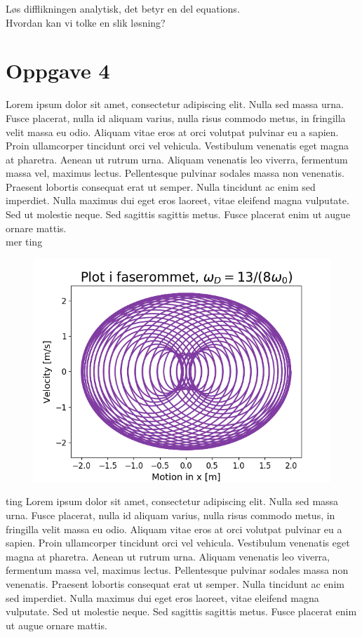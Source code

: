 \documentclass[norsk,a4paper,12pt]{article}
\begin{document}
Løs difflikningen analytisk, det betyr en del equations.
\\
Hvordan kan vi tolke en slik løsning?
\\

\section*{Oppgave 4}

Lorem ipsum dolor sit amet, consectetur adipiscing elit. Nulla sed massa urna. Fusce placerat, nulla id aliquam varius, nulla risus commodo metus, in fringilla velit massa eu odio. Aliquam vitae eros at orci volutpat pulvinar eu a sapien. Proin ullamcorper tincidunt orci vel vehicula. Vestibulum venenatis eget magna at pharetra. Aenean ut rutrum urna. Aliquam venenatis leo viverra, fermentum massa vel, maximus lectus. Pellentesque pulvinar sodales massa non venenatis. Praesent lobortis consequat erat ut semper. Nulla tincidunt ac enim sed imperdiet. Nulla maximus dui eget eros laoreet, vitae eleifend magna vulputate. Sed ut molestie neque. Sed sagittis sagittis metus. Fusce placerat enim ut augue ornare mattis.
\\
mer ting
\begin{figure}[H]
\includegraphics[scale=0.8]{Oppgave4del1.png}
\end{figure}

ting
Lorem ipsum dolor sit amet, consectetur adipiscing elit. Nulla sed massa urna. Fusce placerat, nulla id aliquam varius, nulla risus commodo metus, in fringilla velit massa eu odio. Aliquam vitae eros at orci volutpat pulvinar eu a sapien. Proin ullamcorper tincidunt orci vel vehicula. Vestibulum venenatis eget magna at pharetra. Aenean ut rutrum urna. Aliquam venenatis leo viverra, fermentum massa vel, maximus lectus. Pellentesque pulvinar sodales massa non venenatis. Praesent lobortis consequat erat ut semper. Nulla tincidunt ac enim sed imperdiet. Nulla maximus dui eget eros laoreet, vitae eleifend magna vulputate. Sed ut molestie neque. Sed sagittis sagittis metus. Fusce placerat enim ut augue ornare mattis.
\\
\end{document}
